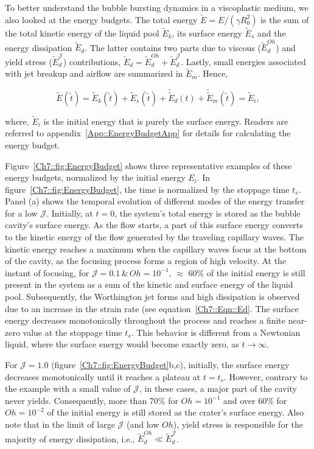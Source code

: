 To better understand the bubble bursting dynamics in a viscoplastic medium, we also looked at the energy budgets. The total energy $\tilde{E} = E/(\gamma R_0^2)$ is the sum of the total kinetic energy of the liquid pool $\tilde{E}_k$, its surface energy $\tilde{E}_s$ and the energy dissipation $\tilde{E}_d$. The latter contains two parts due to viscous ($\tilde{E}_d^{Oh}$) and yield stress ($\tilde{E}_d^\mathcal{J}$) contributions, $\tilde{E}_d = \tilde{E}_d^{Oh} + \tilde{E}_d^\mathcal{J}$. Lastly, small energies associated with jet breakup and airflow are summarized in $\tilde{E}_m$. Hence,

\begin{equation}\label{Eqn::ETotal}
	\tilde{E}(\tilde t) = \tilde{E}_k(\tilde t) + \tilde{E}_s(\tilde t) + \tilde{\tilde E}_d(t) + \tilde{\tilde E}_m(\tilde t) = \tilde{E}_i,
\end{equation}

\noindent where, $\tilde E_i$ is the initial energy that is purely the surface energy. Readers are referred to appendix~\ref{App::EnergyBudgetApp} for details for calculating the energy budget. 

Figure~\ref{Ch7::fig:EnergyBudget} shows three representative examples of these energy budgets, normalized by the initial energy $E_i$. In figure~\ref{Ch7::fig:EnergyBudget}, the time is normalized by the stoppage time $t_s$. Panel (a) shows the temporal evolution of different modes of the energy transfer for a low $\mathcal{J}$.
Initially, at $t = 0$, the system's total energy is stored as the bubble cavity's surface energy. 
As the flow starts, a part of this surface energy converts to the kinetic energy of the flow generated by the traveling capillary waves. The kinetic energy reaches a maximum when the capillary waves focus at the bottom of the cavity, as the focusing process forms a region of high velocity. At the instant of focusing, for $\mathcal{J} = 0.1\,\&\,Oh = 10^{-1}$, $\approx$ 60\% of the initial energy is still present in the system as a sum of the kinetic and surface energy of the liquid pool. Subsequently, the Worthington jet forms and high dissipation is observed due to an increase in the strain rate (see equation~\eqref{Ch7::Eqn::Ed}. The surface energy decreases monotonically throughout the process and reaches a finite near-zero value at the stoppage time $t_s$. This behavior is different from a Newtonian liquid, where the surface energy would become exactly zero, as $t \to \infty$.

For $\mathcal{J} = 1.0$ (figure~\ref{Ch7::fig:EnergyBudget}b,c), initially, the surface energy decreases monotonically until it reaches a plateau at $t = t_s$. However, contrary to the example with a small value of $\mathcal{J}$, in these cases, a major part of the cavity never yields. Consequently, more than 70\% for $Oh =10^{-1}$ and over 60\% for $Oh =10^{-2}$ of the initial energy is still stored as the crater's surface energy. Also note that in the limit of large $\mathcal{J}$ (and low $Oh$), yield stress is responsible for the majority of energy dissipation, i.e., $\tilde E_d^{Oh} \ll \tilde E_d^\mathcal{J}$.

